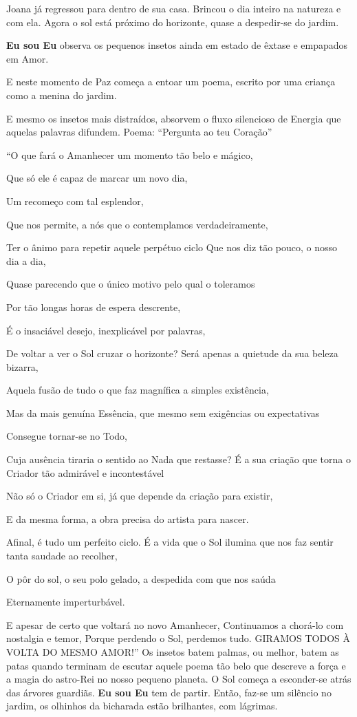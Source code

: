 Joana já regressou para dentro de sua casa. Brincou o dia inteiro na natureza e com ela.
Agora o sol está próximo do horizonte, quase a despedir-se do jardim.

\textbf{Eu sou Eu} observa os pequenos insetos ainda em estado de êxtase e empapados em Amor.

E neste momento de Paz começa a entoar um poema, escrito por uma criança como a menina do jardim.

E mesmo os insetos mais distraídos, absorvem o fluxo silencioso de Energia que aquelas palavras difundem.
\bigbreak
Poema:
\bigbreak
“Pergunta ao teu Coração”

“O que fará o Amanhecer um momento tão belo e mágico,

Que só ele é capaz de marcar um novo dia,

Um recomeço com tal esplendor,

Que nos permite, a nós que o contemplamos verdadeiramente,

Ter o ânimo para repetir aquele perpétuo ciclo
Que nos diz tão pouco, o nosso dia a dia,

Quase parecendo que o único motivo pelo qual o toleramos

Por tão longas horas de espera descrente,

É o insaciável desejo, inexplicável por palavras,

De voltar a ver o Sol cruzar o horizonte?
\bigbreak
Será apenas a quietude da sua beleza bizarra,

Aquela fusão de tudo o que faz magnífica a simples existência,

Mas da mais genuína Essência, que mesmo sem exigências ou expectativas

Consegue tornar-se no Todo,

Cuja ausência tiraria o sentido ao Nada que restasse?
\bigbreak
É a sua criação que torna o Criador tão admirável e incontestável

Não só o Criador em si, já que depende da criação para existir,

E da mesma forma, a obra precisa do artista para nascer.

Afinal, é tudo um perfeito ciclo.
\bigbreak
É a vida que o Sol ilumina que nos faz sentir tanta saudade ao recolher,

O pôr do sol, o seu polo gelado, a despedida com que nos saúda

Eternamente imperturbável.

E apesar de certo que voltará no novo Amanhecer,
Continuamos a chorá-lo com nostalgia e temor,
Porque perdendo o Sol, perdemos tudo.
\bigbreak
GIRAMOS TODOS À VOLTA DO MESMO AMOR!”
\bigbreak
Os insetos batem palmas, ou melhor, batem as patas quando terminam de escutar aquele poema tão belo que descreve a força e a magia do astro-Rei no nosso pequeno planeta.
\bigbreak
O Sol começa a esconder-se atrás das árvores guardiãs. \textbf{Eu sou Eu} tem de partir.
\bigbreak
Então, faz-se um silêncio no jardim, os olhinhos da bicharada estão brilhantes, com lágrimas.

